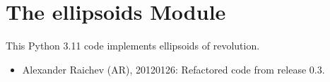 \documentclass[a4paper,12ptopenany,oneside,english]{sphinxmanual}
\begin{document}
\begin{fulllineitems}
\begin{sphinxVerbatim}[commandchars=\\\{\}]
       
                            
                            
                            

   
                            
                            
                            
\end{sphinxVerbatim}

\end{fulllineitems}


\sphinxstepscope


\chapter{The ellipsoids Module}
\label{\detokenize{ellipsoids:module-rhealpixdggs.ellipsoids}}\label{\detokenize{ellipsoids:the-ellipsoids-module}}\label{\detokenize{ellipsoids::doc}}
\sphinxAtStartPar
This Python 3.11 code implements ellipsoids of revolution.
\begin{itemize}
\item {} 
\sphinxAtStartPar
Alexander Raichev (AR), 2012\sphinxhyphen{}01\sphinxhyphen{}26: Refactored code from release 0.3.

\end{itemize}
\end{document}
